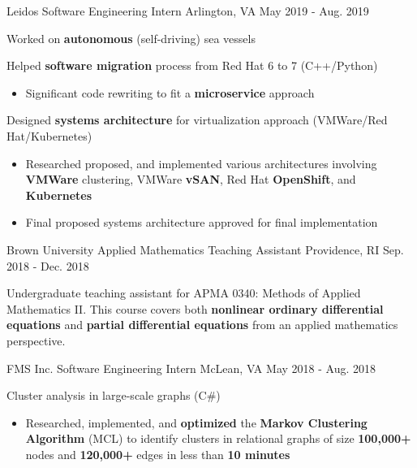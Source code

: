 \begin{cventries}
    \cventry
    {Leidos}
    {Software Engineering Intern}
    {Arlington, VA}
    {May 2019 - Aug. 2019}
    {
        \begin{cvitems}
        \item{Worked on \textbf{autonomous} (self-driving) sea vessels}
        \item{Helped \textbf{software migration} process from Red Hat 6 to 7 (C++/Python)}
            \begin{itemize}
                \item{Significant code rewriting to fit a \textbf{microservice} approach}
            \end{itemize}
        \item{Designed \textbf{systems architecture} for virtualization approach (VMWare/Red Hat/Kubernetes)}
            \begin{itemize}
                \item{Researched proposed, and implemented various architectures involving \textbf{VMWare} clustering, VMWare \textbf{vSAN}, Red Hat \textbf{OpenShift}, and \textbf{Kubernetes}}
                \item{Final proposed systems architecture approved for final implementation}
            \end{itemize}
        \end{cvitems}
    }
    \cventry
	{Brown University}
	{Applied Mathematics Teaching Assistant}
	{Providence, RI}
	{Sep. 2018 - Dec. 2018}
    {
        \begin{cvitems}
		\item{Undergraduate teaching assistant for APMA 0340: Methods of Applied Mathematics II. This course covers both \textbf{nonlinear ordinary differential equations} and \textbf{partial differential equations} from an applied mathematics perspective.}
        \end{cvitems}
    }
    \cventry
	{FMS Inc.}
    {Software Engineering Intern}
    {McLean, VA}
    {May 2018 - Aug. 2018}
    {
        \begin{cvitems}
		\item{Cluster analysis in large-scale graphs (C\#)}
			\begin{itemize}
				\item{Researched, implemented, and \textbf{optimized} the \textbf{Markov Clustering Algorithm} (MCL) to identify clusters in relational graphs of size \textbf{100,000+} nodes and \textbf{120,000+} edges in less than \textbf{10 minutes}}

\end{itemize}
\end{cvitems}}
\end{cventries}
